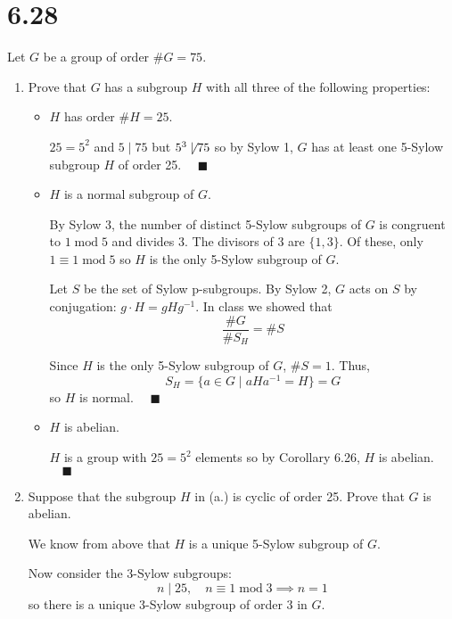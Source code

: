 \documentclass[12pt]{article}
\newcommand{\qed}{\quad \blacksquare}
\renewcommand{\mod}{\;\text{mod}\;}
\begin{document}
\section*{6.28} Let $G$ be a group of order $\#G = 75$.
\begin{enumerate}
    \item Prove that $G$ has a subgroup $H$ with all three of the following properties:
    \begin{itemize}
        \item $H$ has order $\#H = 25$.

            \color{blue}
                $25 = 5^2$ and $5 \mid 75$ but $5^3 \not \mid 75$ so by Sylow 1, $G$ has at least one 5-Sylow subgroup $H$ of order 25. $\qed$
            \color{black}

        \item $H$ is a normal subgroup of $G$.
                
            \color{blue}
                By Sylow 3, the number of distinct 5-Sylow subgroups of $G$ is congruent to $1 \mod 5$ and divides $3$. The divisors of $3$ are $\{1, 3\}$. Of these, only $1 \equiv 1 \mod 5$ so $H$ is the only 5-Sylow subgroup of $G$.

                Let $S$ be the set of Sylow p-subgroups. By Sylow 2, $G$ acts on $S$ by conjugation: $g\cdot H = gHg^{-1}$. In class we showed that 
                \[\frac{\#G}{\#S_H} = \#S\]
                
                Since $H$ is the only 5-Sylow subgroup of $G$, $\#S = 1$. Thus, 
                \[S_H = \{a \in G \; | \; aHa^{-1} = H\} = G\] 
                so $H$ is normal. $\qed$
            \color{black}
            
        \item $H$ is abelian.
        
            \color{blue}
                $H$ is a group with $25 = 5^2$ elements so by Corollary 6.26, $H$ is abelian. $\qed$
            \color{black}
    \end{itemize}
    
    \item Suppose that the subgroup $H$ in (a.) is cyclic of order 25. Prove that $G$ is abelian.
    
        \color{blue}
            We know from above that $H$ is a unique 5-Sylow subgroup of $G$. 
            
            Now consider the $3$-Sylow subgroups: 
            \[n \mid 25, \quad n \equiv 1 \mod 3 \implies n = 1\]
            so there is a unique 3-Sylow subgroup of order $3$ in $G$. 


\end{enumerate}
\end{document}

